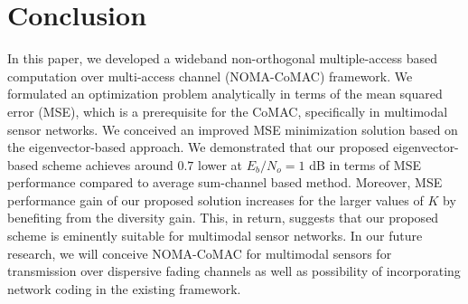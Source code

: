 \documentclass[journal]{IEEEtran}
\theoremstyle{definition}
\begin{document}
\section{Conclusion}
	\label{conclusion}
		In this paper, we developed a wideband non-orthogonal multiple-access based computation over multi-access channel (NOMA-CoMAC) framework. We formulated an optimization problem analytically in terms of the mean squared error (MSE), which is a prerequisite for the CoMAC, specifically in multimodal sensor networks.	We conceived an improved MSE minimization solution based on the eigenvector-based approach. 
		We demonstrated that our proposed eigenvector-based scheme achieves around $0.7$ lower at $E_b/N_o = 1$ dB in terms of MSE performance compared to average sum-channel based method. Moreover, MSE performance gain of our proposed solution increases for the larger values of $K$ by benefiting from the diversity gain. This, in return, suggests that our proposed scheme is eminently suitable for multimodal sensor networks.
		 In our future research, we will conceive NOMA-CoMAC for multimodal sensors for transmission over dispersive fading channels as well as possibility of incorporating network coding in the existing framework. 


 \vspace{-0.4cm}
 
	
		
%
%


\end{document}
